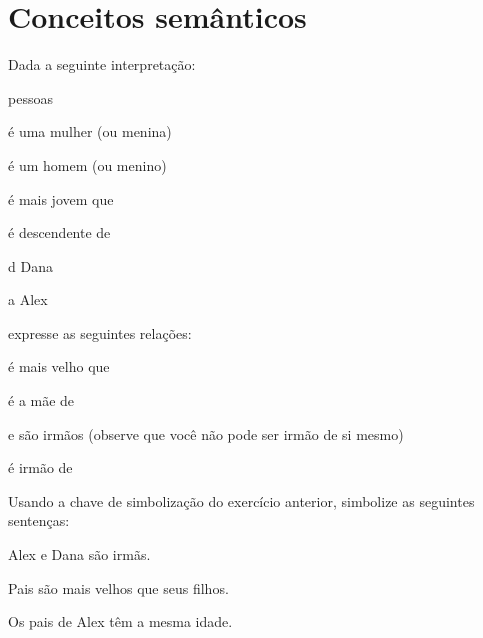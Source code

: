 \chapter{Conceitos semânticos}
\setcounter{ProbPart}{0}

\solutions
\problempart
Dada a seguinte interpretação:
\begin{ekey}
	\item[\text{domínio}] pessoas
	\item[\atom{W}{x}]  é uma mulher (ou menina)
	\item[\atom{M}{x}]  é um homem (ou menino)
	\item[\atom{Y}{x,y}]  é mais jovem que 
	\item[\atom{O}{x,y}]  é descendente de 
	\item[d] Dana
	\item[a] Alex
\end{ekey}
expresse as seguintes relações:
\begin{compactlist}
	\item {} é mais velho que  \hfill{}
	\item {} é a mãe de  \hfill{}
	\item {} e  são irmãos (observe que você não pode ser irmão de si mesmo) \hfill{}

	\item {} é irmão de  \hfill{}
\end{compactlist}

\problempart
Usando a chave de simbolização do exercício anterior, simbolize as seguintes sentenças:

\begin{compactlist}
	\item Alex e Dana são irmãs. \hfill{}
	\item Pais são mais velhos que seus filhos.
	\hfill{}
	\item Os pais de Alex têm a mesma idade. \hfill{}
\end{compactlist}


